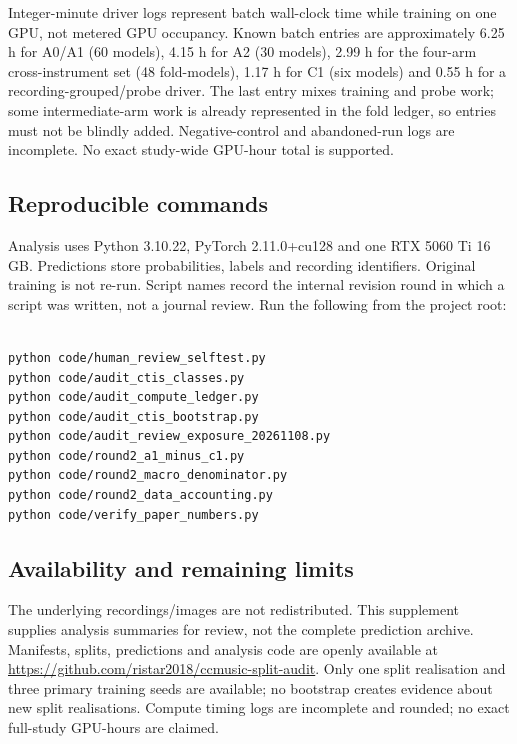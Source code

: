 Integer-minute driver logs represent batch wall-clock time while training on one GPU, not metered GPU occupancy. Known batch entries are approximately 6.25 h for A0/A1 (60 models), 4.15 h for A2 (30 models), 2.99 h for the four-arm cross-instrument set (48 fold-models), 1.17 h for C1 (six models) and 0.55 h for a recording-grouped/probe driver. The last entry mixes training and probe work; some intermediate-arm work is already represented in the fold ledger, so entries must not be blindly added. Negative-control and abandoned-run logs are incomplete. No exact study-wide GPU-hour total is supported.

\subsection{Reproducible commands}

Analysis uses Python 3.10.22, PyTorch 2.11.0+cu128 and one RTX 5060 Ti 16 GB. Predictions store probabilities, labels and recording identifiers. Original training is not re-run. Script names record the internal revision round in which a script was written, not a journal review. Run the following from the project root:

\begin{verbatim}

python code/human_review_selftest.py
python code/audit_ctis_classes.py
python code/audit_compute_ledger.py
python code/audit_ctis_bootstrap.py
python code/audit_review_exposure_20261108.py
python code/round2_a1_minus_c1.py
python code/round2_macro_denominator.py
python code/round2_data_accounting.py
python code/verify_paper_numbers.py

\end{verbatim}

\subsection{Availability and remaining limits}

The underlying recordings/images are not redistributed. This supplement supplies analysis summaries for review, not the complete prediction archive. Manifests, splits, predictions and analysis code are openly available at
\url{https://github.com/ristar2018/ccmusic-split-audit}. Only one split realisation and three primary training seeds are available; no bootstrap creates evidence about new split realisations. Compute timing logs are incomplete and rounded; no exact full-study GPU-hours are claimed.
